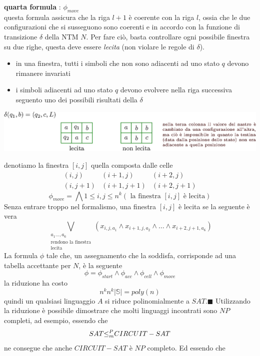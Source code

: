 \documentclass[10pt, letterpaper]{report}
\begin{document}
\textbf{quarta formula} : $\phi_{move}$\\
questa formula assicura che la riga $l+1$ è coerente con la riga $l$, ossia che le due configurazioni che si susseguono sono coerenti e in accordo con la funzione di transizione $\delta$ della NTM $N$. Per fare ciò, basta controllare ogni possibile finestra su due righe, questa deve essere \textit{lecita} (non violare le regole di $\delta$).\begin{itemize}
    \item in una finestra, tutti i simboli che non sono adiacenti ad uno stato $q$ devono rimanere invariati 
    \item i simboli adiacenti ad uno stato $q$ devono evolvere nella riga successiva seguento uno dei possibili risultati della $\delta$
\end{itemize}\begin{center}
    \includegraphics[width=\textwidth ]{images/finestraLecita.eps}
\end{center}
denotiamo la finestra $[i,j]$ quella composta dalle celle$$ \begin{matrix}
    (i,j) & (i+1,j) & (i+2,j)\\ 
    (i,j+1) & (i+1,j+1) & (i+2,j+1)
\end{matrix}$$
$$ \phi_{move}=\bigwedge\limits{1 \leq i,j \leq n^k}
(\text{ la finestra $[i,j]$ è lecita})$$
Senza entrare troppo nel formalismo, una finestra $[i,j]$ è lecita se la seguente è vera 
$$ \bigvee_{\begin{matrix}
a_1\dots,a_6\\ 
\text{rendono la finestra}\\\text{lecita}
\end{matrix}}
(x_{i,j,a_1}\land x_{i+1,j,a_2}\land \dots \land x_{i+2,j+1,a_6})
$$
La formula $\phi$ tale che, un assegnamento che la soddisfa, corrisponde ad una tabella accettante per $N$, è la seguente 
$$ \phi = \phi_{start}\land \phi_{acc}\land \phi_{cell}\land \phi_{move}$$
la riduzione ha costo $$ n^kn^k|\mathbb S|=poly(n)$$
quindi un qualsiasi linguaggio $A$ si riduce polinomialmente a $SAT$.\hfill$\blacksquare$\acc   
Utilizzando la riduzione è possibile dimostrare che molti linguaggi incontrati sono $NP$ completi, ad esempio, essendo che $$ SAT{\le_m^P} CIRCUIT-SAT$$
ne consegue che anche $CIRCUIT-SAT$ è $NP$ completo. Ed essendo che 
\end{document}
